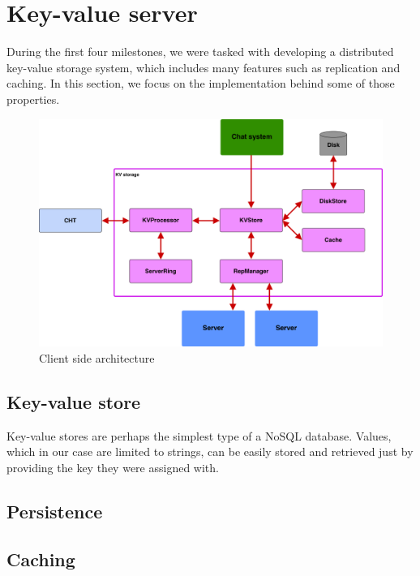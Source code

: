 \section{Key-value server}
During the first four milestones, we were tasked with developing a distributed key-value storage system, which includes many features such as replication and caching. In this section, we focus on the implementation behind some of those properties.

\begin{figure}[h]
	\centering
	\includegraphics[width=\linewidth]{figures/kvs_arch.png}
	\caption{Client side architecture}
\end{figure}

\subsection{Key-value store}
Key-value stores are perhaps the simplest type of a NoSQL database. Values, which in our case are limited to strings, can be easily stored and retrieved just by providing the key they were assigned with. 

\subsection{Persistence}

\subsection{Caching}



